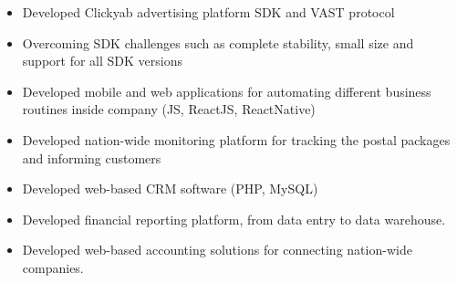 \documentclass[10pt,a4paper,ragged2e]{altacv}
\begin{document}
\divider

\begin{itemize}
\item Developed Clickyab advertising platform SDK and VAST protocol
\item Overcoming SDK challenges such as complete stability, small size and support
  for all SDK versions
\end{itemize}

\divider

\begin{itemize}
\item Developed mobile and web applications for automating different business
  routines inside company (JS, ReactJS, ReactNative)
\item Developed nation-wide monitoring platform for tracking the postal packages and informing customers
\end{itemize}
 
 \divider

\begin{itemize}
\item Developed web-based CRM software (PHP, MySQL)
\item Developed financial reporting platform, from data entry
  to data warehouse.
\item Developed web-based accounting solutions for connecting nation-wide companies.
\end{itemize} 

\divider







\end{document}
